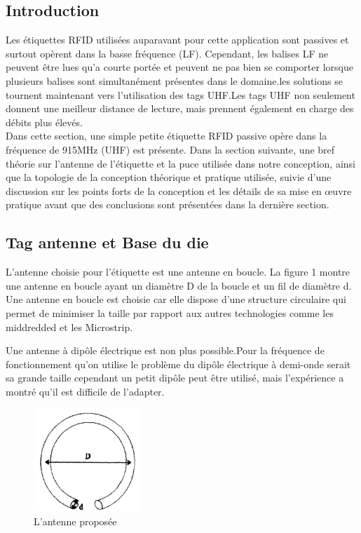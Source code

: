 \documentclass[11pt, a4paper, twoside]{book}
\begin{document}
\subsection{Introduction}
Les étiquettes RFID utilisées auparavant pour cette application sont passives et surtout opèrent dans la basse fréquence (LF). Cependant, les balises LF ne peuvent être lues qu'a courte portée et peuvent ne pas bien se comporter lorsque plusieurs balises sont simultanément présentes dans le domaine.les solutions se tournent maintenant vers l'utilisation des tags UHF.Les tags UHF non seulement donnent une meilleur distance de lecture, mais prennent également en charge des débits plus élevés. \\

Dans cette section, une simple petite étiquette RFID passive opère dans la fréquence de 915MHz (UHF) est présente. Dans la section suivante, une bref  théorie  sur l'antenne de l'étiquette et la puce utilisée dans notre conception, ainsi que la topologie de la conception théorique et pratique utilisée, suivie d'une discussion sur les points forts de la conception et les détails de sa mise en œuvre pratique avant que des conclusions sont présentées dans la dernière section.
\subsection{Tag antenne et Base du die}
L'antenne choisie pour l'étiquette  est une antenne en boucle. La figure 1 montre une antenne en boucle ayant un diamètre D de la boucle et un fil de diamètre d. Une antenne en boucle est choisie car elle dispose d'une structure circulaire qui permet de minimiser la taille par rapport aux autres technologies comme les middredded et les Microstrip. 

Une antenne à dipôle électrique est non plus possible.Pour la fréquence de fonctionnement qu'on utilise le problème du dipôle électrique à demi-onde  serait sa grande taille cependant un petit dipôle peut être utilisé, mais l'expérience a montré qu'il est difficile de l'adapter.
\begin{figure}[H]
\centering
\includegraphics[width=4cm]{cla}
\caption{L'antenne proposée}
\end{figure}
\end{document}
